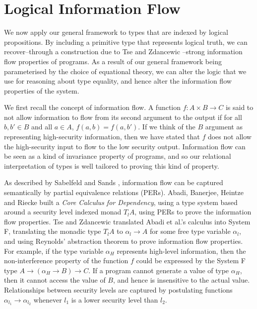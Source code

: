 \section{Logical Information Flow}
\label{sec:information-flow}

\newcommand{\infoflow}{\mathit{Log}}

We now apply our general framework to types that are indexed by
logical propositions. By including a primitive type that represents
logical truth, we can recover--through a construction due to Tse and
Zdancewic \cite{tse04translating}--strong information flow properties
of programs. As a result of our general framework being parameterised
by the choice of equational theory, we can alter the logic that we use
for reasoning about type equality, and hence alter the information
flow properties of the system. 

We first recall the concept of information flow. A function $f : A
\times B \to C$ is said to not allow information to flow from its
second argument to the output if for all $b,b' \in B$ and all $a \in
A$, $f(a,b) = f(a,b')$. If we think of the $B$ argument as
representing high-security information, then we have stated that $f$
does not allow the high-security input to flow to the low security
output. Information flow can be seen as a kind of invariance property
of programs, and so our relational interpretation of types is well
tailored to proving this kind of property.

As described by Sabelfeld and Sands \cite{sabelfeld01per}, information
flow can be captured semantically by partial equivalence relations
(PERs). Abadi, Banerjee, Heintze and Riecke \cite{abadi99core} built a
\emph{Core Calculus for Dependency}, using a type system based around
a security level indexed monad $T_lA$, using PERs to prove the
information flow properties. Tse and Zdancewic \cite{tse04translating}
translated Abadi et al.'s calculus into System F, translating the
monadic type $T_lA$ to $\alpha_l \to A$ for some free type variable
$\alpha_l$, and using Reynolds' abstraction theorem to prove
information flow properties. For example, if the type variable
$\alpha_H$ represents high-level information, then the
non-interference property of the function $f$ could be expressed by
the System F type $A \to (\alpha_H \to B) \to C$. If a program cannot
generate a value of type $\alpha_H$, then it cannot access the value
of $B$, and hence is insensitive to the actual value. Relationships
between security levels are captured by postulating functions
$\alpha_{l_1} \to \alpha_{l_2}$ whenever $l_1$ is a lower security
level than $l_2$.

